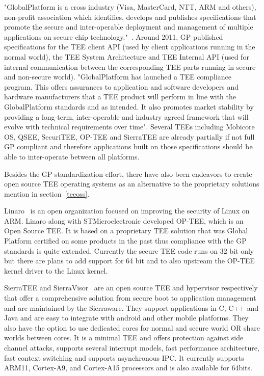 \documentclass[cameraready]{cseminar}
\begin{document}
"GlobalPlatform is a cross industry (Visa, MasterCard, NTT, ARM and others), non-profit association which identifies, develops and publishes specifications that promote the secure and inter-operable deployment and management of multiple applications on secure chip technology."~\cite{gpspec}. Around 2011, GP published specifications for the TEE client API (used by client applications running in the normal world), the TEE System Architecture and TEE Internal API (used for internal communication between the corresponding TEE parts running in secure and non-secure world). "GlobalPlatform has launched a TEE compliance program. This offers assurances to application and software developers and hardware manufacturers that a TEE product will perform in line with the GlobalPlatform standards and as intended. It also promotes market stability by providing a long-term, inter-operable and industry agreed framework that will evolve with technical requirements over time". Several TEEs including Mobicore OS, QSEE, SecuriTEE, OP-TEE and SierraTEE are already partially if not full GP compliant and therefore applications built on those specifications should be able to inter-operate between all platforms.

Besides the GP standardization effort, there have also been endeavors to create open source TEE operating systems as an alternative to the proprietary solutions mention in section~\ref{teeoss}.

Linaro~\cite{linarooptee} is an open organization focused on improving the security of Linux on ARM. Linaro along with STMicroelectronic developed OP-TEE, which is an Open Source TEE. It is based on a proprietary TEE solution that was Global Platform certified on some products in the past thus compliance with the GP standards is quite extended. Currently the secure TEE code runs on 32 bit only but there are plans to add support for 64 bit and to also upstream the OP-TEE kernel driver to the Linux kernel.

SierraTEE and SierraVisor~\cite{sierratee} are an open source TEE and hypervisor respectively that offer a comprehensive solution from secure boot to application management and are maintained by the Sierraware. They support applications in C, C++ and Java and are easy to integrate with android and other mobile platforms. They also have the option to use dedicated cores for normal and secure world OR share worlds between cores. It is a minimal TEE and offers protection against side channel attacks, supports several interrupt models, fast performance architecture, fast context switching and supports asynchronous IPC. It currently supports ARM11, Cortex-A9, and Cortex-A15 processors and is also available for 64bits.
\end{document}
